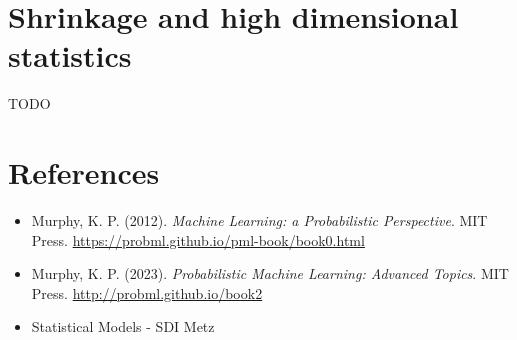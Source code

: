 \documentclass[12pt, a4paper]{article}
\theoremstyle{definition}
\numberwithin{figure}{section}
\numberwithin{equation}{section}
\numberwithin{table}{section}
\begin{document}

\section{Shrinkage and high dimensional statistics}
TODO




% 

\newpage
\section{References}
\begin{itemize}
    \item Murphy, K. P. (2012). \textit{Machine Learning: a Probabilistic Perspective}. MIT Press. \url{https://probml.github.io/pml-book/book0.html}
    \item Murphy, K. P. (2023). \textit{Probabilistic Machine Learning: Advanced Topics}. MIT Press. \url{http://probml.github.io/book2}
    \item Statistical Models - SDI Metz
\end{itemize}
\end{document}

